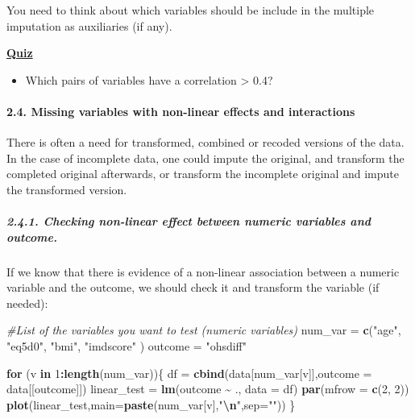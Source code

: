 \documentclass[
]{article}
\newenvironment{Shaded}{\begin{snugshade}}{\end{snugshade}}
\newcommand{\AttributeTok}[1]{\textcolor[rgb]{0.13,0.29,0.53}{#1}}
\newcommand{\CommentTok}[1]{\textcolor[rgb]{0.56,0.35,0.01}{\textit{#1}}}
\newcommand{\ControlFlowTok}[1]{\textcolor[rgb]{0.13,0.29,0.53}{\textbf{#1}}}
\newcommand{\DecValTok}[1]{\textcolor[rgb]{0.00,0.00,0.81}{#1}}
\newcommand{\FunctionTok}[1]{\textcolor[rgb]{0.13,0.29,0.53}{\textbf{#1}}}
\newcommand{\NormalTok}[1]{#1}
\newcommand{\OtherTok}[1]{\textcolor[rgb]{0.56,0.35,0.01}{#1}}
\newcommand{\SpecialCharTok}[1]{\textcolor[rgb]{0.81,0.36,0.00}{\textbf{#1}}}
\newcommand{\StringTok}[1]{\textcolor[rgb]{0.31,0.60,0.02}{#1}}
\providecommand{\tightlist}{%
  \setlength{\itemsep}{0pt}\setlength{\parskip}{0pt}}
\begin{document}
You need to think about which variables should be include in the
multiple imputation as auxiliaries (if any).

\ul{\textbf{Quiz}}

\begin{itemize}
\tightlist
\item
  Which pairs of variables have a correlation \textgreater{} 0.4?
\end{itemize}

\hypertarget{missing-variables-with-non-linear-effects-and-interactions}{%
\paragraph{2.4. Missing variables with non-linear effects and
interactions}\label{missing-variables-with-non-linear-effects-and-interactions}}

There is often a need for transformed, combined or recoded versions of
the data. In the case of incomplete data, one could impute the original,
and transform the completed original afterwards, or transform the
incomplete original and impute the transformed version.

\hypertarget{checking-non-linear-effect-between-numeric-variables-and-outcome.}{%
\subparagraph{2.4.1. Checking non-linear effect between numeric
variables and
outcome.}\label{checking-non-linear-effect-between-numeric-variables-and-outcome.}}

If we know that there is evidence of a non-linear association between a
numeric variable and the outcome, we should check it and transform the
variable (if needed):

\begin{Shaded}
\begin{Highlighting}[]
\CommentTok{\#List of the variables you want to test (numeric variables)}
\NormalTok{num\_var }\OtherTok{=} \FunctionTok{c}\NormalTok{(}\StringTok{"age"}\NormalTok{, }\StringTok{"eq5d0"}\NormalTok{, }\StringTok{"bmi"}\NormalTok{, }\StringTok{"imdscore"}\NormalTok{ )}
\NormalTok{outcome }\OtherTok{=} \StringTok{"ohsdiff"}

\ControlFlowTok{for}\NormalTok{ (v }\ControlFlowTok{in} \DecValTok{1}\SpecialCharTok{:}\FunctionTok{length}\NormalTok{(num\_var))\{}
\NormalTok{  df }\OtherTok{=} \FunctionTok{cbind}\NormalTok{(data[num\_var[v]],}\AttributeTok{outcome =}\NormalTok{ data[[outcome]])}
\NormalTok{  linear\_test }\OtherTok{=} \FunctionTok{lm}\NormalTok{(outcome }\SpecialCharTok{\textasciitilde{}}\NormalTok{ ., }\AttributeTok{data =}\NormalTok{ df)}
  \FunctionTok{par}\NormalTok{(}\AttributeTok{mfrow =} \FunctionTok{c}\NormalTok{(}\DecValTok{2}\NormalTok{, }\DecValTok{2}\NormalTok{))}
  \FunctionTok{plot}\NormalTok{(linear\_test,}\AttributeTok{main=}\FunctionTok{paste}\NormalTok{(num\_var[v],}\StringTok{"}\SpecialCharTok{\textbackslash{}n}\StringTok{"}\NormalTok{,}\AttributeTok{sep=}\StringTok{""}\NormalTok{))}
\NormalTok{\}}
\end{Highlighting}
\end{Shaded}
\end{document}
